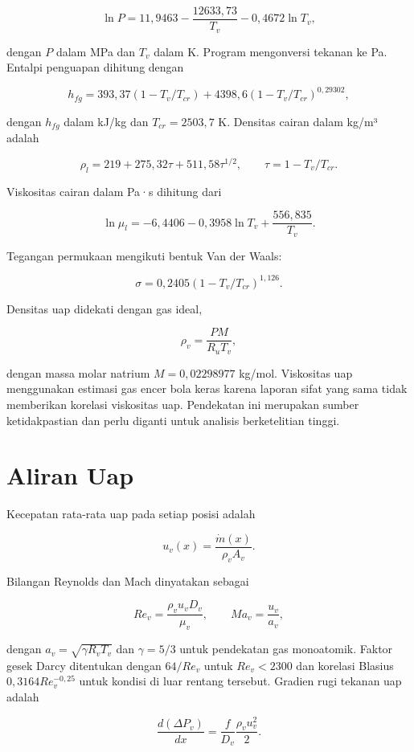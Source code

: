 \documentclass[
  12pt,a4paper,oneside]{report}
\begin{document}
\[
\ln P=11{,}9463-\frac{12633{,}73}{T_v}-0{,}4672\ln T_v,
\tag{3.4}\]

dengan \(P\) dalam MPa dan \(T_v\) dalam K. Program mengonversi tekanan
ke Pa. Entalpi penguapan dihitung dengan

\[
h_{fg}=393{,}37(1-T_v/T_{cr})+4398{,}6(1-T_v/T_{cr})^{0{,}29302},
\tag{3.5}\]

dengan \(h_{fg}\) dalam kJ/kg dan \(T_{cr}=2503{,}7\) K. Densitas cairan
dalam kg/m³ adalah

\[
\rho_l=219+275{,}32\tau+511{,}58\tau^{1/2},
\qquad \tau=1-T_v/T_{cr}.
\tag{3.6}\]

Viskositas cairan dalam Pa·s dihitung dari

\[
\ln\mu_l=-6{,}4406-0{,}3958\ln T_v+\frac{556{,}835}{T_v}.
\tag{3.7}\]

Tegangan permukaan mengikuti bentuk Van der Waals:

\[
\sigma=0{,}2405(1-T_v/T_{cr})^{1{,}126}.
\tag{3.8}\]

Densitas uap didekati dengan gas ideal,

\[
\rho_v=\frac{PM}{R_uT_v},
\tag{3.9}\]

dengan massa molar natrium \(M=0{,}02298977\) kg/mol. Viskositas uap
menggunakan estimasi gas encer bola keras karena laporan sifat yang sama
tidak memberikan korelasi viskositas uap. Pendekatan ini merupakan
sumber ketidakpastian dan perlu diganti untuk analisis berketelitian
tinggi.

\hypertarget{aliran-uap}{%
\section{Aliran Uap}\label{aliran-uap}}

Kecepatan rata-rata uap pada setiap posisi adalah

\[
u_v(x)=\frac{\dot m(x)}{\rho_v A_v}.
\tag{3.10}\]

Bilangan Reynolds dan Mach dinyatakan sebagai

\[
Re_v=\frac{\rho_v u_vD_v}{\mu_v},\qquad Ma_v=\frac{u_v}{a_v},
\tag{3.11}\]

dengan \(a_v=\sqrt{\gamma R_vT_v}\) dan \(\gamma=5/3\) untuk pendekatan
gas monoatomik. Faktor gesek Darcy ditentukan dengan \(64/Re_v\) untuk
\(Re_v<2300\) dan korelasi Blasius \(0{,}3164Re_v^{-0{,}25}\) untuk
kondisi di luar rentang tersebut. Gradien rugi tekanan uap adalah

\[
\frac{d(\Delta P_v)}{dx}=\frac{f}{D_v}\frac{\rho_v u_v^2}{2}.
\tag{3.12}\]
\end{document}
